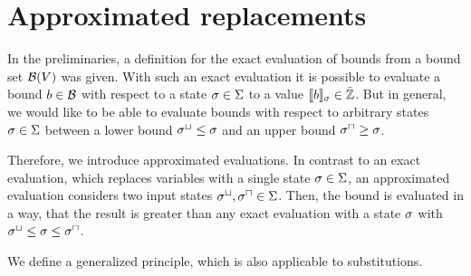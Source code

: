\section{Approximated replacements}

In the preliminaries, a definition for the exact evaluation of bounds from a bound set $\mathcal{B}(V)$ was given.
With such an exact evaluation it is possible to evaluate a bound $b \in \mathcal{B}$ with respect to a state $\sigma \in \Sigma$ to a value $\llbracket b \rrbracket_{\sigma} \in \bar{\mathbb{Z}}$.
But in general, we would like to be able to evaluate bounds with respect to arbitrary states $\sigma \in \Sigma$ between a lower bound ${\sigma^\sqcup} \leq \sigma$ and an upper bound ${\sigma^\sqcap} \geq \sigma$.

Therefore, we introduce approximated evaluations.
In contrast to an exact evaluation, which replaces variables with a single state $\sigma \in \Sigma$, an approximated evaluation considers two input states ${\sigma^\sqcup}, {\sigma^\sqcap} \in \Sigma$.
Then, the bound is evaluated in a way, that the result is greater than any exact evaluation with a state $\sigma$ with ${\sigma^\sqcup} \leq \sigma \leq {\sigma^\sqcap}$.

We define a generalized principle, which is also applicable to substitutions.

